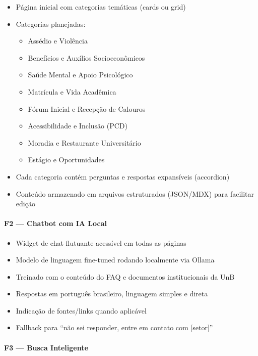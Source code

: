 \documentclass[12pt, a4paper]{article}
\begin{document}
\begin{itemize}
  \item Página inicial com categorias temáticas (cards ou grid)
  \item Categorias planejadas:
    \begin{itemize}
      \item Assédio e Violência
      \item Benefícios e Auxílios Socioeconômicos
      \item Saúde Mental e Apoio Psicológico
      \item Matrícula e Vida Acadêmica
      \item Fórum Inicial e Recepção de Calouros
      \item Acessibilidade e Inclusão (PCD)
      \item Moradia e Restaurante Universitário
      \item Estágio e Oportunidades
    \end{itemize}
  \item Cada categoria contém perguntas e respostas expansíveis (accordion)
  \item Conteúdo armazenado em arquivos estruturados (JSON/MDX) para facilitar edição
\end{itemize}

\paragraph{F2 — Chatbot com IA Local}

\begin{itemize}
  \item Widget de chat flutuante acessível em todas as páginas
  \item Modelo de linguagem fine-tuned rodando localmente via Ollama
  \item Treinado com o conteúdo do FAQ e documentos institucionais da UnB
  \item Respostas em português brasileiro, linguagem simples e direta
  \item Indicação de fontes/links quando aplicável
  \item Fallback para ``não sei responder, entre em contato com [setor]''
\end{itemize}

\paragraph{F3 — Busca Inteligente}
\end{document}

